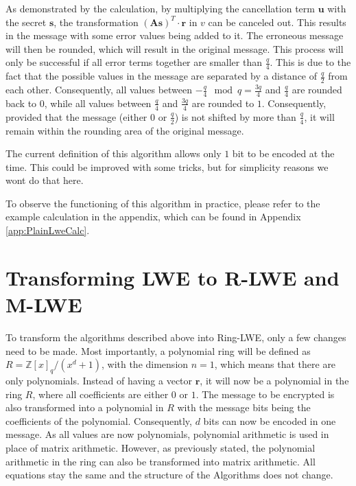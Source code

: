 As demonstrated by the calculation, by multiplying the cancellation term $\textbf{u}$ with the secret $\textbf{s}$, the transformation $(\textbf{As})^T \cdot \textbf{r}$ in $v$ can be canceled out. This results in the message with some error values being added to it. The erroneous message will then be rounded, which will result in the original message. This process will only be successful if all error terms together are smaller than $\frac{q}{4}$. This is due to the fact that the possible values in the message are separated by a distance of $\frac{q}{2}$ from each other. Consequently, all values between $-\frac{q}{4}\mod q=\frac{3q}{4}$ and $\frac{q}{4}$ are rounded back to $0$, while all values between $\frac{q}{4}$ and $\frac{3q}{4}$ are rounded to $1$. Consequently, provided that the message (either $0$ or $\frac{q}{2}$) is not shifted by more than $\frac{q}{4}$, it will remain within the rounding area of the original message.


The current definition of this algorithm allows only $1$ bit to be encoded at the time. This could be improved with some tricks, but for simplicity reasons we wont do that here. 

To observe the functioning of this algorithm in practice, please refer to the example calculation in the appendix, which can be found in Appendix \ref{app:PlainLweCalc}.

\section{Transforming LWE to R-LWE and M-LWE}
\label{sec:TransformingLweToRlweAndMlwe}

To transform the algorithms described above into Ring-LWE, only a few changes need to be made. Most importantly, a polynomial ring will be defined as $R = \mathbb{Z}[x]_q/(x^d+1)$, with the dimension $n=1$, which means that there are only polynomials. Instead of having a vector $\textbf{r}$, it will now be a polynomial in the ring $R$, where all coefficients are either $0$ or $1$. The message to be encrypted is also transformed into a polynomial in $R$ with the message bits being the coefficients of the polynomial. Consequently, $d$ bits can now be encoded in one message. As all values are now polynomials, polynomial arithmetic is used in place of matrix arithmetic. However, as previously stated, the polynomial arithmetic in the ring can also be transformed into matrix arithmetic. All equations stay the same and the structure of the Algorithms does not change.

